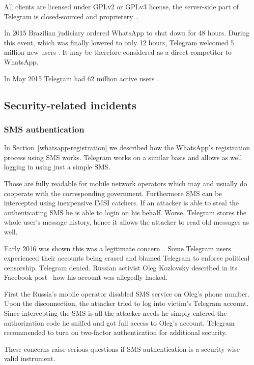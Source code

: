 \documentclass[thesis=M,english]{FITthesis}[2012/10/20]
\begin{document}
All clients are licensed under GPLv2 or GPLv3 license, the server-side part of Telegram is closed-sourced and proprietery~\cite{telegram-server}.

In 2015 Brazilian judiciary ordered WhatsApp to shut down for 48 hours. During this event, which was finally lowered to only 12 hours, Telegram welcomed 5 million new users \cite{whatsappbrazil}. It may be therefore considered as a direct competitor to WhatsApp.

In May 2015 Telegram had 62 million active users~\cite{telegram-users}.


\subsection{Security-related incidents}

\subsubsection{SMS authentication}

In Section~\ref{whatsapp-registration} we described how the WhatsApp's registration process using SMS works. Telegram works on a similar basis and allows as well logging in using just a simple SMS.

Those are fully readable for mobile network operators which may and usually do cooperate with the corresponding government. Furthermore SMS can be intercepted using inexpensive IMSI catchers. If an attacker is able to steal the authenticating SMS he is able to login on his behalf. Worse, Telegram stores the whole user's message history, hence it allows the attacker to read old messages as well.

Early 2016 was shown this was a legitimate concern~\cite{telegram-smsiran}. Some Telegram users experienced their accounts being erased and blamed Telegram to enforce political censorship. Telegram denied. Russian activist Oleg Kozlovsky described in its Facebook post~\cite{telegram-russia} how his account was allegedly hacked.

First the Russia's mobile operator disabled SMS service on Oleg's phone number. Upon the disconnection, the attacker tried to log into victim's Telegram account. Since intercepting the SMS is all the attacker needs he simply entered the authorization code he sniffed and got full access to Oleg's account. Telegram recommended to turn on two-factor authentication for additional security.

These concerns raise serious questions if SMS authentication is a security-wise valid instrument.
\end{document}

